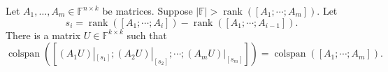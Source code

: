 \documentclass{daj}
\newcommand{\FF}{\mathbb{F}}
\DeclareMathOperator{\rank}{rank} \DeclareMathOperator{\col}{colspan}
\begin{document}
\begin{lemma}\label{lem:max-rank-induction}
    Let $A_1, \ldots, A_m \in \FF^{n \times k}$ be matrices. Suppose $|\FF| > \rank([A_1; \cdots; A_m])$. Let 
    \[
    s_i = \rank([A_1; \cdots ; A_{i}]) - \rank([A_1; \cdots ; A_{i-1}]).
    \]
    There is a matrix $U \in \FF^{k \times k}$ such that
\begin{equation}\label{eq:cspan2}
    \col([(A_1 U)|_{[s_1]} ; (A_2 U)|_{[s_2]} ; \cdots ; (A_m U)|_{[s_m]}]) = \col([A_1; \cdots ; A_m]).
\end{equation}
\end{lemma}
\end{document}
